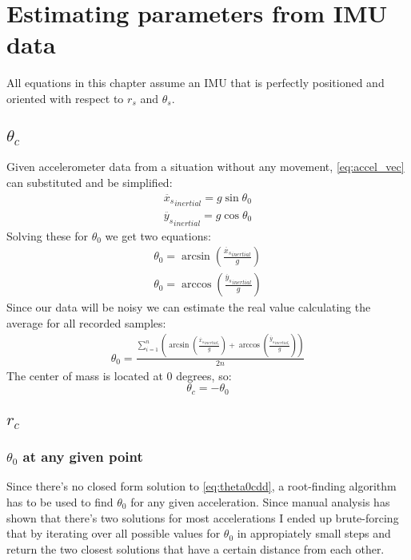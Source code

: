 \documentclass[titlepage]{article}
\numberwithin{equation}{section}
\begin{document}
\section{Estimating parameters from IMU data}
All equations in this chapter assume an IMU that is perfectly positioned and oriented with respect to $r_s$ and $\theta_s$.

\subsection{$\theta_c$}
Given accelerometer data from a situation without any movement, \ref{eq:accel_vec} can substituted and be simplified:
\begin{align}
\ddot{x_s}_{inertial} = g \sin{\theta_0} \\
\ddot{y_s}_{inertial} = g \cos{\theta_0}
\end{align}
Solving these for $\theta_0$ we get two equations:
\begin{align}
\theta_0 = \arcsin{\left(\frac{\ddot{x_s}_{inertial}}{g}\right)} \\
\theta_0 = \arccos{\left(\frac{\ddot{y_s}_{inertial}}{g}\right)}
\end{align}
Since our data will be noisy we can estimate the real value calculating the average for all recorded samples:
\begin{align}
\theta_0 = \frac{
    \sum_{i=1}^{n}\left(
        \arcsin{\left(\frac{\ddot{x_s}_{inertial_i}}{g}\right)}
        + \arccos{\left(\frac{\ddot{y_s}_{inertial_i}}{g}\right)}
    \right)
} {
    2 n
}
\end{align}
The center of mass is located at 0 degrees, so:
\begin{equation}
\theta_c = - \theta_0
\end{equation}

\subsection{$r_c$}
\subsubsection{$\theta_0$ at any given point}
Since there's no closed form solution to \ref{eq:theta0cdd}, a root-finding algorithm has to be used to find $\theta_0$ for any given acceleration. Since manual analysis has shown that there's two solutions for most accelerations I ended up brute-forcing that by iterating over all possible values for $\theta_0$ in appropiately small steps and return the two closest solutions that have a certain distance from each other.
\end{document}
